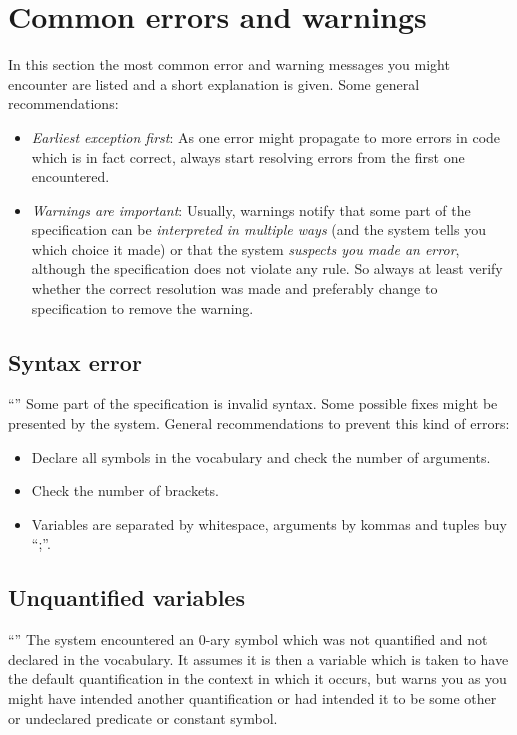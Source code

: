 \section{Common errors and warnings}
In this section the most common error and warning messages you might encounter are listed and a short explanation is given.
Some general recommendations:
\begin{itemize}
  \item \emph{Earliest exception first}: As one error might propagate to more errors in code which is in fact correct, always start resolving errors from the first one encountered.
  \item \emph{Warnings are important}: Usually, warnings notify that some part of the specification can be \emph{interpreted in multiple ways} (and the system tells you which choice it made) or that the system \emph{suspects you made an error}, although the specification does not violate any rule. So always at least verify whether the correct resolution was made and preferably change to specification to remove the warning.
\end{itemize}

\subsection{Syntax error}
``''
Some part of the specification is invalid \fodotidp syntax. Some possible fixes might be presented by the system.
General recommendations to prevent this kind of errors:
\begin{itemize}
  \item Declare all symbols in the vocabulary and check the number of arguments.
  \item Check the number of brackets.
  \item Variables are separated by whitespace, arguments by kommas and tuples buy ``;''.
\end{itemize}

\subsection{Unquantified variables}
``''
The system encountered an 0-ary symbol which was not quantified and not declared in the vocabulary.
It assumes it is then a variable which is taken to have the default quantification in the context in which it occurs, but warns you as you might have intended another quantification or had intended it to be some other or undeclared predicate or constant symbol.

